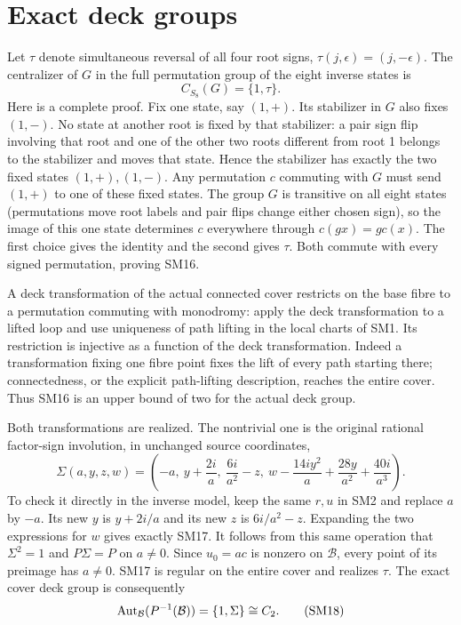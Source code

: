 \section{Exact deck groups}
Let $\tau$ denote simultaneous reversal of all four root signs,
$\tau(j,\epsilon)=(j,-\epsilon)$. The centralizer of $G$ in
the full permutation group of the eight inverse states is
\begin{equation}
 C_{S_8}(G)=\{1,\tau\}.\tag{SM16}
\end{equation}
Here is a complete proof. Fix one state, say $(1,+)$. Its
stabilizer in $G$ also fixes $(1,-)$. No state at another root
is fixed by that stabilizer: a pair sign flip involving that
root and one of the other two roots different from root 1
belongs to the stabilizer and moves that state. Hence the
stabilizer has exactly the two fixed states $(1,+),(1,-)$.
Any permutation $c$ commuting with $G$ must send $(1,+)$ to
one of these fixed states. The group $G$ is transitive on all
eight states (permutations move root labels and pair flips
change either chosen sign), so the image of this one state
determines $c$ everywhere through $c(gx)=g c(x)$. The first
choice gives the identity and the second gives $\tau$.
Both commute with every signed permutation, proving SM16.

A deck transformation of the actual connected cover restricts
on the base fibre to a permutation commuting with monodromy:
apply the deck transformation to a lifted loop and use uniqueness
of path lifting in the local charts of SM1. Its restriction is
injective as a function of the deck transformation. Indeed a
transformation fixing one fibre point fixes the lift of every
path starting there; connectedness, or the explicit path-lifting
description, reaches the entire cover. Thus SM16 is an upper
bound of two for the actual deck group.

Both transformations are realized. The nontrivial one is the
original rational factor-sign involution, in unchanged source
coordinates,
\begin{equation}
 \Sigma(a,y,z,w)=\left(-a,\ y+\frac{2i}{a},\
 \frac{6i}{a^2}-z,\
 w-\frac{14iy^2}{a}+\frac{28y}{a^2}+\frac{40i}{a^3}\right).
 \tag{SM17}
\end{equation}
To check it directly in the inverse model, keep the same $r,u$
in SM2 and replace $a$ by $-a$. Its new $y$ is $y+2i/a$ and
its new $z$ is $6i/a^2-z$. Expanding the two expressions for
$w$ gives exactly SM17. It follows from this same operation
that $\Sigma^2=1$ and $P\Sigma=P$ on $a\ne0$. Since $u_0=ac$
is nonzero on $\mathcal B$, every point of its preimage has
$a\ne0$. SM17 is regular on the entire cover and realizes
$\tau$. The exact cover deck group is consequently
\begin{equation}
 \operatorname{Aut}_{\mathcal B}(P^{-1}(\mathcal B))=\{1,\Sigma\}\cong C_2.
 \tag{SM18}
\end{equation}

